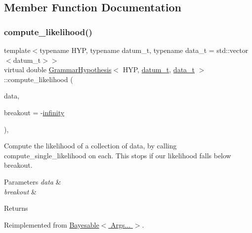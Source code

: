 \subsection{Member Function Documentation}
\mbox{\label{class_grammar_hypothesis_a35008279d3455087b7ea541f3259becb}} 
\subsubsection{\texorpdfstring{compute\+\_\+likelihood()}{compute\_likelihood()}}
{\footnotesize\ttfamily template$<$typename H\+YP, typename datum\+\_\+t, typename data\+\_\+t = std\+::vector$<$datum\+\_\+t$>$$>$ \\
virtual double \hyperlink{class_grammar_hypothesis}{Grammar\+Hypothesis}$<$ H\+YP, \hyperlink{class_bayesable_a9f1a6c0cd7855550fa10b1a8f13a5867}{datum\+\_\+t}, \hyperlink{class_bayesable_aa2788c4d7718c0a824e1d28c4c98f921}{data\+\_\+t} $>$\+::compute\+\_\+likelihood (\begin{DoxyParamCaption}\item[{const \hyperlink{class_bayesable_aa2788c4d7718c0a824e1d28c4c98f921}{data\+\_\+t} \&}]{data,  }\item[{const double}]{breakout = {\ttfamily -\/\hyperlink{_numerics_8h_a1bb1e42ae1b40cad6e99da0aab8a5576}{infinity}} }\end{DoxyParamCaption})\hspace{0.3cm}{\ttfamily [inline]}, {\ttfamily [virtual]}}



Compute the likelihood of a collection of data, by calling compute\+\_\+single\+\_\+likelihood on each. This stops if our likelihood falls below breakout. 


\begin{DoxyParams}{Parameters}
{\em data} & \\
\hline
{\em breakout} & \\
\hline
\end{DoxyParams}
\begin{DoxyReturn}{Returns}

\end{DoxyReturn}


Reimplemented from \hyperlink{class_bayesable_a202493156cec15937bee304d807fdbdb}{Bayesable$<$ Args... $>$}.

